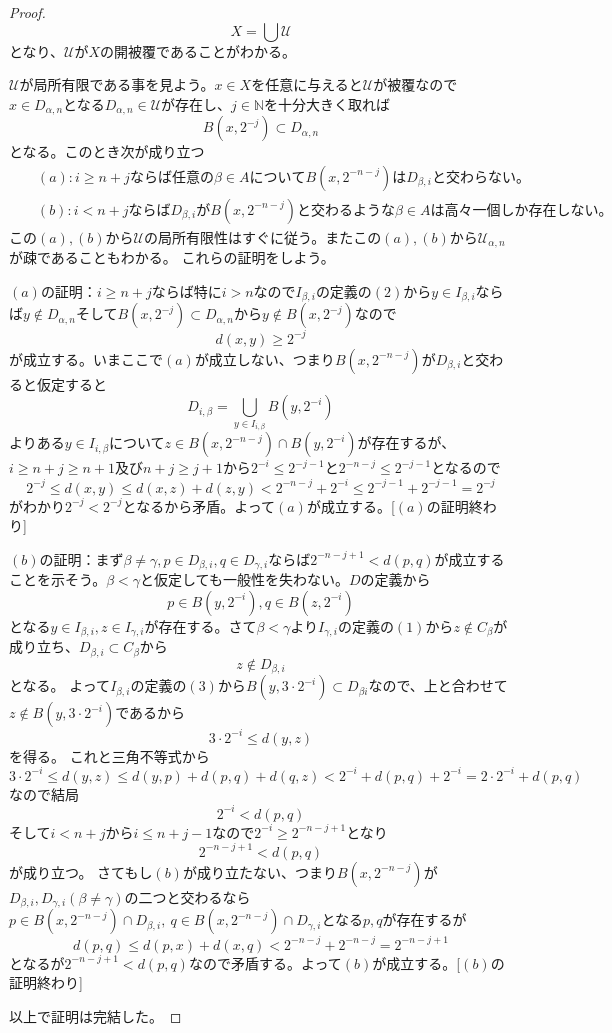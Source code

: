 \documentclass[leqno]{jsarticle}
\newcommand{\nn}{\mathbb{N}}
\newcommand{\al}{\alpha}
\newcommand{\be}{\beta}
\newcommand{\ga}{\gamma}
\begin{document}
\begin{proof}
\[
X=\bigcup\mathcal{U}
\]
となり、$\mathcal{U}$が$X$の開被覆であることがわかる。\par
$\mathcal{U}$が局所有限である事を見よう。$x\in X$を任意に与えると$\mathcal{U}$が被覆なので
$x\in D_{\al,n}$となる$D_{\al,n}\in \mathcal{U}$が存在し、$j\in \nn$を十分大きく取れば
\[
B(x,2^{-j})\subset D_{\al,n}
\]
となる。このとき次が成り立つ
\begin{eqnarray*}
&&(a):i\ge n+jならば任意の\be \in AについてB(x,2^{-n-j})はD_{\be,i}と交わらない。\\
&&(b):i<n+jならばD_{\be,i}がB(x,2^{-n-j})と交わるような\be\in A は高々一個しか存在しない。
\end{eqnarray*}
この$(a),(b)$から$\mathcal{U}$の局所有限性はすぐに従う。またこの$(a),(b)$から$\mathcal{U}_{\al,n}$が疎であることもわかる。
これらの証明をしよう。\par
$(a)$の証明：$i\ge n+j$ならば特に$i>n$なので$I_{\be,i}$の定義の$(2)$から$y\in I_{\be,i}$ならば$y\not\in D_{\al,n}$そして$B(x,2^{-j})\subset D_{\al,n}$から$y\not\in B(x,2^{-j})$なので
\[
d(x,y)\ge 2^{-j}
\]
が成立する。いまここで$(a)$が成立しない、つまり$B(x,2^{-n-j})$が$D_{\be,i}$と交わると仮定すると
\[
D_{i,\be }=\bigcup_{y\in I_{i,\be}}B(y,2^{-i})
\]
よりある$y\in I_{i,\be}$について$z\in B(x,2^{-n-j})\cap B(y,2^{-i})$が存在するが、$i\ge n+j\ge n+1$及び$n+j\ge j+1$から$2^{-i}\le 2^{-j-1}$と$2^{-n-j}\le 2^{-j-1}$となるので
\[
2^{-j}\le d(x,y)\le d(x,z)+d(z,y)<2^{-n-j}+2^{-i}\le 2^{-j-1}+2^{-j-1}=2^{-j}
\]
がわかり$2^{-j}<2^{-j}$となるから矛盾。よって$(a)$が成立する。[$(a)$の証明終わり]\par
$(b)$の証明：まず$\be\neq\ga,p\in D_{\be,i},q\in D_{\ga,i}$ならば$2^{-n-j+1}<d(p,q)$が成立することを示そう。$\be<\ga$と仮定しても一般性を失わない。$D$の定義から
\[
p\in B(y,2^{-i}),q\in B(z,2^{-i})
\]
となる$y\in I_{\be,i},z\in I_{\ga,i}$が存在する。さて$\be<\ga$より$I_{\ga,i}$の定義の$(1)$から$z\not\in C_{\be }$が成り立ち、$D_{\be,i}\subset C_{\be}$から
\[
z\not\in D_{\be,i}
\]
となる。
よって$I_{\be,i}$の定義の$(3)$から$B(y,3\cdot 2^{-i})\subset D_{\be i}$なので、上と合わせて$z\not\in B(y,3\cdot 2^{-i})$であるから
\[
3\cdot 2^{-i}\le d(y,z)
\]
を得る。
これと三角不等式から
\[
3\cdot 2^{-i}\le d(y,z)\le d(y,p)+d(p,q)+d(q,z)<2^{-i}+d(p,q)+2^{-i}=2\cdot 2^{-i}+d(p,q)
\]
なので結局
\[
2^{-i}<d(p,q)
\]
そして$i<n+j$から$i\le n+j-1$なので$2^{-i}\ge 2^{-n-j+1}$となり
\[
2^{-n-j+1}<d(p,q)
\]が成り立つ。
さてもし$(b)$が成り立たない、つまり$B(x,2^{-n-j})$が$D_{\be,i},D_{\ga,i}(\be\neq \ga)$の二つと交わるなら\\$p\in B(x,2^{-n-j})\cap D_{\be,i},\ q\in B(x,2^{-n-j})\cap D_{\ga,i}$となる$p,q$が存在するが
\[
d(p,q)\le d(p,x)+d(x,q)<2^{-n-j}+2^{-n-j}=2^{-n-j+1}
\]
となるが$2^{-n-j+1}<d(p,q)$なので矛盾する。よって$(b)$が成立する。[$(b)$の証明終わり]\par
以上で証明は完結した。
\end{proof}
\end{document}

